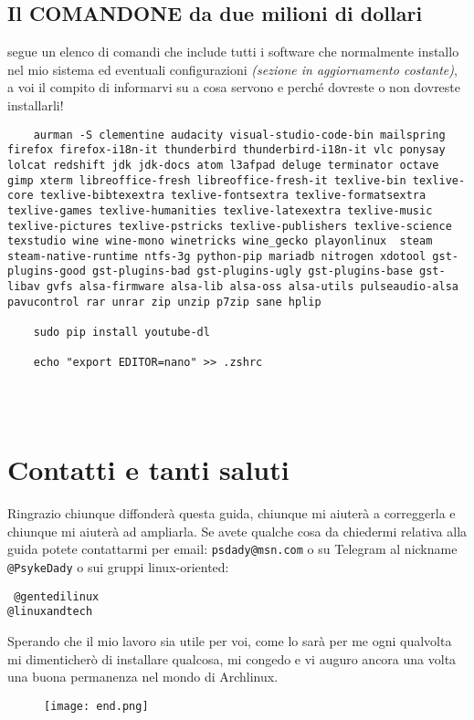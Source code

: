 \documentclass[twoside,italian]{book}
\newcommand{\centcode}[1]{
	
	\definecolor{centcode}{rgb}{0.5,0.1,0.1}
	
	\begin{center}
	 	\texttt{\textcolor{centcode}{#1}}
	\end{center}
	
	
}
\newcommand{\code}[1]{
	\texttt{\textcolor{code}{#1}}
}
\begin{document}
		\section{Il COMANDONE da due milioni di dollari}
			segue un elenco di comandi che include tutti i software che normalmente installo nel mio sistema ed eventuali configurazioni \textit{(sezione in aggiornamento costante)}, a voi il compito di informarvi su a cosa servono e perché dovreste o non dovreste installarli!
\begin{lstlisting}
	aurman -S clementine audacity visual-studio-code-bin mailspring firefox firefox-i18n-it thunderbird thunderbird-i18n-it vlc ponysay lolcat redshift jdk jdk-docs atom l3afpad deluge terminator octave gimp xterm libreoffice-fresh libreoffice-fresh-it texlive-bin texlive-core texlive-bibtexextra texlive-fontsextra texlive-formatsextra texlive-games texlive-humanities texlive-latexextra texlive-music texlive-pictures texlive-pstricks texlive-publishers texlive-science texstudio wine wine-mono winetricks wine_gecko playonlinux  steam steam-native-runtime ntfs-3g python-pip mariadb nitrogen xdotool gst-plugins-good gst-plugins-bad gst-plugins-ugly gst-plugins-base gst-libav gvfs alsa-firmware alsa-lib alsa-oss alsa-utils pulseaudio-alsa pavucontrol rar unrar zip unzip p7zip sane hplip
	
	sudo pip install youtube-dl
	
	echo "export EDITOR=nano" >> .zshrc
	
	
	
\end{lstlisting}


	\chapter{Contatti e tanti saluti}
		Ringrazio chiunque diffonderà questa guida, chiunque mi aiuterà a correggerla e chiunque mi aiuterà ad ampliarla. 
		Se avete qualche cosa da chiedermi relativa alla guida potete contattarmi per email: \code{psdady@msn.com} o su Telegram al nickname \code{@PsykeDady} o sui gruppi linux-oriented: \centcode{
			@gentedilinux\\
			  @linuxandtech
		}		
		
		Sperando che il mio lavoro sia utile per voi, come lo sarà per me ogni qualvolta mi dimenticherò di installare qualcosa, mi congedo e vi auguro ancora una volta una  buona permanenza nel mondo di Archlinux.
		\newpage
		\begin{figure}[p]
			\centering
			\texttt{[image: end.png]}
		\end{figure}
					
			
\end{document}
